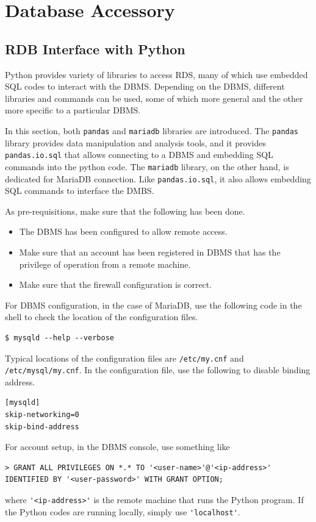 \section{Database Accessory}

\subsection{RDB Interface with Python}

Python provides variety of libraries to access RDS, many of which use embedded SQL codes to interact with the DBMS. Depending on the DBMS, different libraries and commands can be used, some of which more general and the other more specific to a particular DBMS.

In this section, both \verb|pandas| and \verb|mariadb| libraries are introduced. The \verb|pandas| library provides data manipulation and analysis tools, and it provides \verb|pandas.io.sql| that allows connecting to a DBMS and embedding SQL commands into the python code. The \verb|mariadb| library, on the other hand, is dedicated for MariaDB connection. Like \verb|pandas.io.sql|, it also allows embedding SQL commands to interface the DMBS.

As pre-requisitions, make sure that the following has been done.
\begin{itemize}
	\item The DBMS has been configured to allow remote access.
	\item Make sure that an account has been registered in DBMS that has the privilege of operation from a remote machine.
	\item Make sure that the firewall configuration is correct.
\end{itemize}

For DBMS configuration, in the case of MariaDB, use the following code in the shell to check the location of the configuration files.
\begin{lstlisting}
$ mysqld --help --verbose
\end{lstlisting}
Typical locations of the configuration files are \verb|/etc/my.cnf| and \verb|/etc/mysql/my.cnf|. In the configuration file, use the following to disable binding address.
\begin{lstlisting}
[mysqld]
skip-networking=0
skip-bind-address
\end{lstlisting}

For account setup, in the DBMS console, use something like
\begin{lstlisting}
> GRANT ALL PRIVILEGES ON *.* TO '<user-name>'@'<ip-address>' IDENTIFIED BY '<user-password>' WITH GRANT OPTION;
\end{lstlisting}
where \verb|'<ip-address>'| is the remote machine that runs the Python program. If the Python codes are running locally, simply use \verb|'localhost'|.

